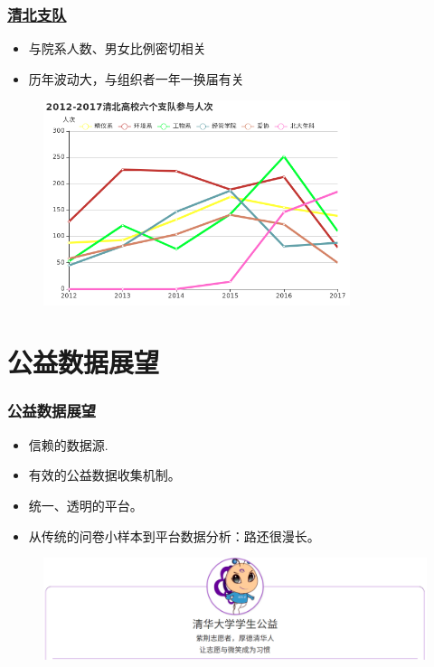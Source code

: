 \documentclass{ctexbeamer}
\begin{document}
\begin{frame}
\frametitle{\href{http://data-visualization.leidenschaft.cn/bv2008.html}{清北支队}}
\begin{itemize}
\item 与院系人数、男女比例密切相关
\item 历年波动大，与组织者一年一换届有关
\end{itemize}
\begin{figure}
\includegraphics[width=0.8\textwidth]{student5.png}
\end{figure}
\end{frame}
\section{公益数据展望}%
\begin{frame}
\frametitle{公益数据展望}
\begin{itemize}
\item 信赖的数据源.%
\item 有效的公益数据收集机制。%
\item 统一、透明的平台。%
\item 从传统的问卷小样本到平台数据分析：路还很漫长。
\end{itemize}
\begin{figure}
\centering
\includegraphics[width=\textwidth]{footer.png}
\end{figure}
\end{frame}
\end{document}
